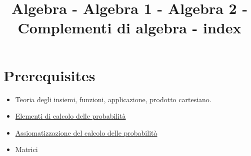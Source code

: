 \documentclass[a4paper,10pt]{article}
\title{Algebra - Algebra 1 - Algebra 2 - Complementi di algebra - index}
\author{}
\begin{document}
\maketitle



\section{Prerequisites}
\begin{itemize}
 \item Teoria degli insiemi, funzioni, applicazione, prodotto cartesiano.
 \item \href{./CalcProb.html}{Elementi di calcolo delle probabilità}
 \item \href{./AssiomiProb.html}{Assiomatizzazione del calcolo delle probabilità}
 \item Matrici
\end{itemize}
\end{document}
